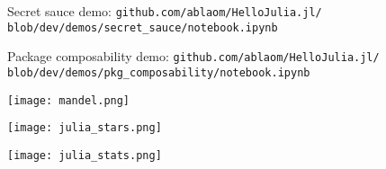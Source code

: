 \documentclass[t]{beamer}
\newcommand\df{\bf\color{Maroon}}
\begin{document}
\begin{frame}
  \begin{block}{Secret sauce demo:}
    {\large\texttt{github.com/ablaom/HelloJulia.jl/}}\newline
    {\large\texttt{blob/dev/demos/secret\_sauce/notebook.ipynb}}
    \end{block}
\end{frame}
%
\begin{frame}
  \begin{block}{Package composability demo:}
    {\large\texttt{github.com/ablaom/HelloJulia.jl/}}\newline
    {\large\texttt{blob/dev/demos/pkg\_composability/notebook.ipynb}}
    \end{block}
\end{frame}

\begin{frame}[plain]
     \texttt{[image: mandel.png]}
\end{frame}
\begin{frame}[plain]
     \texttt{[image: julia\_stars.png]}
\end{frame}



\begin{frame}[plain]
     \texttt{[image: julia\_stats.png]}
\end{frame}





\end{document}
